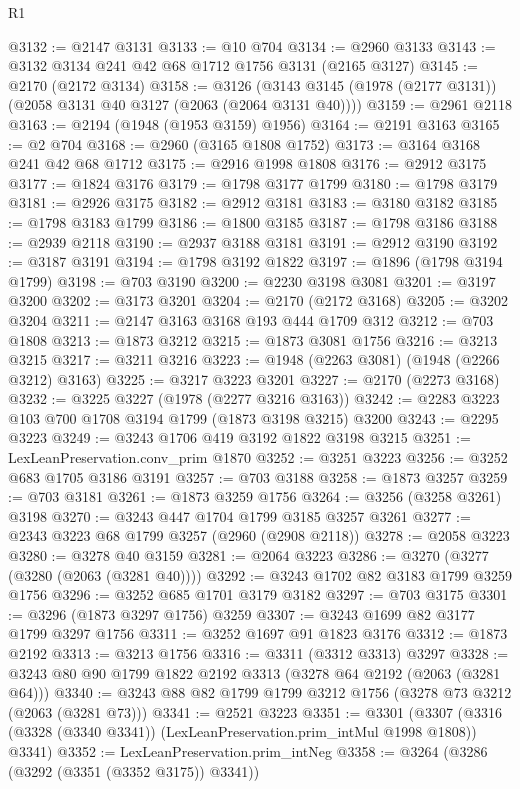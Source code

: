 \begin{lexlean}{R1}
\begin{coremodule}
@3132 := @2147 @3131
@3133 := @10 @704
@3134 := @2960 @3133
@3143 := @3132 @3134 @241 @42 @68 @1712 @1756 @3131 (@2165 @3127)
@3145 := @2170 (@2172 @3134)
@3158 := @3126 (@3143 @3145 (@1978 (@2177 @3131)) (@2058 @3131 @40 @3127 (@2063 (@2064 @3131 @40))))
@3159 := @2961 @2118
@3163 := @2194 (@1948 (@1953 @3159) @1956)
@3164 := @2191 @3163
@3165 := @2 @704
@3168 := @2960 (@3165 @1808 @1752)
@3173 := @3164 @3168 @241 @42 @68 @1712
@3175 := @2916 @1998 @1808
@3176 := @2912 @3175
@3177 := @1824 @3176
@3179 := @1798 @3177 @1799
@3180 := @1798 @3179
@3181 := @2926 @3175
@3182 := @2912 @3181
@3183 := @3180 @3182
@3185 := @1798 @3183 @1799
@3186 := @1800 @3185
@3187 := @1798 @3186
@3188 := @2939 @2118
@3190 := @2937 @3188 @3181
@3191 := @2912 @3190
@3192 := @3187 @3191
@3194 := @1798 @3192 @1822
@3197 := @1896 (@1798 @3194 @1799)
@3198 := @703 @3190
@3200 := @2230 @3198 @3081
@3201 := @3197 @3200
@3202 := @3173 @3201
@3204 := @2170 (@2172 @3168)
@3205 := @3202 @3204
@3211 := @2147 @3163 @3168 @193 @444 @1709 @312
@3212 := @703 @1808
@3213 := @1873 @3212
@3215 := @1873 @3081 @1756
@3216 := @3213 @3215
@3217 := @3211 @3216
@3223 := @1948 (@2263 @3081) (@1948 (@2266 @3212) @3163)
@3225 := @3217 @3223 @3201
@3227 := @2170 (@2273 @3168)
@3232 := @3225 @3227 (@1978 (@2277 @3216 @3163))
@3242 := @2283 @3223 @103 @700 @1708 @3194 @1799 (@1873 @3198 @3215) @3200
@3243 := @2295 @3223
@3249 := @3243 @1706 @419 @3192 @1822 @3198 @3215
@3251 := LexLeanPreservation.conv_prim @1870
@3252 := @3251 @3223
@3256 := @3252 @683 @1705 @3186 @3191
@3257 := @703 @3188
@3258 := @1873 @3257
@3259 := @703 @3181
@3261 := @1873 @3259 @1756
@3264 := @3256 (@3258 @3261) @3198
@3270 := @3243 @447 @1704 @1799 @3185 @3257 @3261
@3277 := @2343 @3223 @68 @1799 @3257 (@2960 (@2908 @2118))
@3278 := @2058 @3223
@3280 := @3278 @40 @3159
@3281 := @2064 @3223
@3286 := @3270 (@3277 (@3280 (@2063 (@3281 @40))))
@3292 := @3243 @1702 @82 @3183 @1799 @3259 @1756
@3296 := @3252 @685 @1701 @3179 @3182
@3297 := @703 @3175
@3301 := @3296 (@1873 @3297 @1756) @3259
@3307 := @3243 @1699 @82 @3177 @1799 @3297 @1756
@3311 := @3252 @1697 @91 @1823 @3176
@3312 := @1873 @2192
@3313 := @3213 @1756
@3316 := @3311 (@3312 @3313) @3297
@3328 := @3243 @80 @90 @1799 @1822 @2192 @3313 (@3278 @64 @2192 (@2063 (@3281 @64)))
@3340 := @3243 @88 @82 @1799 @1799 @3212 @1756 (@3278 @73 @3212 (@2063 (@3281 @73)))
@3341 := @2521 @3223
@3351 := @3301
    (@3307 (@3316 (@3328 (@3340 @3341)) (LexLeanPreservation.prim_intMul @1998 @1808)) @3341)
@3352 := LexLeanPreservation.prim_intNeg
@3358 := @3264 (@3286 (@3292 (@3351 (@3352 @3175)) @3341))

\end{coremodule}
\end{lexlean}
